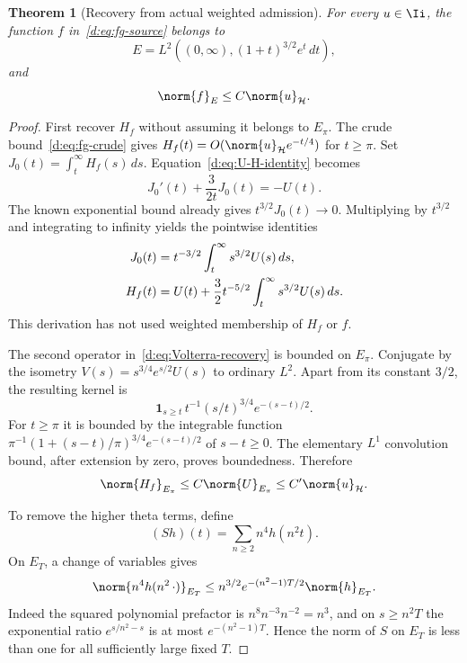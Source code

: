 \documentclass[11pt,a4paper]{article}
\numberwithin{equation}{section}
\newtheorem{theorem}{Theorem}[section]
\theoremstyle{definition}\newtheorem{definition}[theorem]{Definition}
\theoremstyle{remark}\newtheorem{remark}[theorem]{Remark}
\newcommand{\Hh}{\mathcal H}\newcommand{\Hw}{\mathcal H}
\begin{document}
\begin{theorem}[Recovery from actual weighted admission]\label{d:thm:recovery}
For every $u\in\Ii$, the function $f$ in~\eqref{d:eq:fg-source} belongs to
\begin{equation}\label{d:eq:E-global}
 E=L^2((0,\infty),(1+t)^{3/2}e^t\,dt),
\end{equation}
and
\begin{equation}\label{d:eq:recovery-bound}
 \norm{f}_E\le C\norm{u}_{\Hh}.
\end{equation}
\end{theorem}
\begin{proof}
First recover $H_f$ without assuming it belongs to $E_\pi$. The crude bound~\eqref{d:eq:fg-crude} gives
$H_f(t)=O(\norm{u}_{\Hh}e^{-t/4})$ for $t\ge\pi$. Set
$J_0(t)=\int_t^\infty H_f(s)\,ds$. Equation~\eqref{d:eq:U-H-identity} becomes
\[
 J_0'(t)+\frac3{2t}J_0(t)=-U(t).
\]
The known exponential bound already gives $t^{3/2}J_0(t)\to0$. Multiplying by $t^{3/2}$ and integrating to infinity yields the pointwise identities
\begin{align}
 J_0(t)&=t^{-3/2}\int_t^\infty s^{3/2}U(s)\,ds,\notag\\
 H_f(t)&=U(t)+\frac32t^{-5/2}\int_t^\infty s^{3/2}U(s)\,ds.
 \label{d:eq:Volterra-recovery}
\end{align}
This derivation has not used weighted membership of $H_f$ or $f$.

The second operator in~\eqref{d:eq:Volterra-recovery} is bounded on $E_\pi$. Conjugate by the isometry
$V(s)=s^{3/4}e^{s/2}U(s)$ to ordinary $L^2$. Apart from its constant $3/2$, the resulting kernel is
\[
 \boldsymbol1_{s\ge t}\,t^{-1}(s/t)^{3/4}e^{-(s-t)/2}.
\]
For $t\ge\pi$ it is bounded by the integrable function
$\pi^{-1}(1+(s-t)/\pi)^{3/4}e^{-(s-t)/2}$ of $s-t\ge0$.
The elementary $L^1$ convolution bound, after extension by zero, proves boundedness. Therefore
\begin{equation}\label{d:eq:Hf-weighted}
 \norm{H_f}_{E_\pi}\le C\norm{U}_{E_\pi}
 \le C'\norm{u}_{\Hh}.
\end{equation}

To remove the higher theta terms, define
\[
 (Sh)(t)=\sum_{n\ge2}n^4h(n^2t).
\]
On $E_T$, a change of variables gives
\begin{equation}\label{d:eq:dilation-E}
 \norm{n^4h(n^2\,\cdot)}_{E_T}
 \le n^{3/2}e^{-(n^2-1)T/2}\norm{h}_{E_T}.
\end{equation}
Indeed the squared polynomial prefactor is $n^8n^{-3}n^{-2}=n^3$, and on $s\ge n^2T$ the exponential ratio
$e^{s/n^2-s}$ is at most $e^{-(n^2-1)T}$. Hence the norm of $S$ on $E_T$ is less than one for all sufficiently large fixed $T$.


\end{proof}
\end{document}
